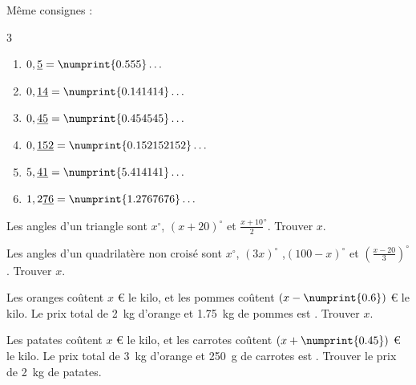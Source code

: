 \begin{exercise} \label{chapter07:exercice:miseenequation00} Même consignes : 
	\begin{multicols}{3}
		\begin{enumerate}[label={$\alph*=$}, leftmargin=*]
			\item $0,\underline{5}=\numprint{0.555}\ldots$  
			\item $0,\underline{14}=\numprint{0.141414}\ldots$ 
			\item $0,\underline{45}=\numprint{0.454545}\ldots$ 
			\item $0,\underline{152}=\numprint{0.152152152}\ldots$  
			\item $5,\underline{41}=\numprint{5.414141}\ldots$ 
			\item $1,2\underline{76}=\numprint{1.2767676}\ldots$ 
		\end{enumerate}
	\end{multicols}  
\end{exercise}  
\begin{exercise}\label{chapter07:exercice:miseenequation01}\hfill 
	
	Les angles d'un triangle sont $x^\circ$, $(x+20)^\circ$ et $\tfrac{x+10}{2}^\circ$. Trouver $x$.
\end{exercise} 
\begin{exercise}\label{chapter07:exercice:miseenequation02}\hfill 
	
	Les angles d'un quadrilatère non croisé sont $x^\circ$, $(3x)^\circ$ ,$(100-x)^\circ$ et $\left(\tfrac{x-20}{3}\right)^\circ$. Trouver $x$.
\end{exercise} 
\begin{exercise}\label{chapter07:exercice:miseenequation03}\hfill 
	
	Les oranges coûtent $x$ € le kilo, et les pommes coûtent $(x-\numprint{0.6})$ € le kilo. Le prix total de \SI{2}{\kilo\gram} d'orange et \SI{1.75}{\kilo\gram} de pommes est . Trouver $x$. 
\end{exercise} 
\begin{exercise}\label{chapter07:exercice:miseenequation04}\hfill 
	
	Les patates coûtent $x$ € le kilo, et les carrotes coûtent $(x+\numprint{0.45})$ € le kilo. Le prix total de \SI{3}{\kilo\gram} d'orange et \SI{250}{\gram} de carrotes est . Trouver le prix de \SI{2}{\kilo\gram} de patates. 
\end{exercise} 
